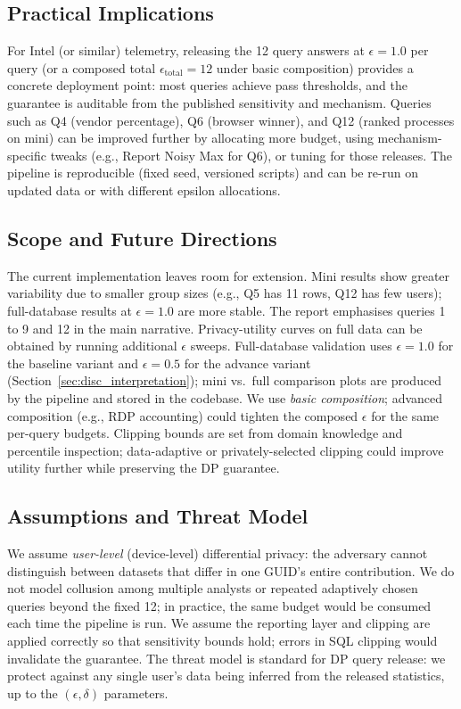 \documentclass[12pt,letterpaper]{article}
\begin{document}
\subsection{Practical Implications}
\label{sec:disc_practical}

For Intel (or similar) telemetry, releasing the 12 query answers at $\epsilon = 1.0$ per query (or a composed total $\epsilon_{\text{total}} = 12$ under basic composition) provides a concrete deployment point: most queries achieve pass thresholds, and the guarantee is auditable from the published sensitivity and mechanism. Queries such as Q4 (vendor percentage), Q6 (browser winner), and Q12 (ranked processes on mini) can be improved further by allocating more budget, using mechanism-specific tweaks (e.g., Report Noisy Max for Q6), or tuning for those releases. The pipeline is reproducible (fixed seed, versioned scripts) and can be re-run on updated data or with different epsilon allocations.

\subsection{Scope and Future Directions}
\label{sec:disc_limitations}

The current implementation leaves room for extension. Mini results show greater variability due to smaller group sizes (e.g., Q5 has 11 rows, Q12 has few users); full-database results at $\epsilon = 1.0$ are more stable. The report emphasises queries 1 to 9 and 12 in the main narrative. Privacy-utility curves on full data can be obtained by running additional $\epsilon$ sweeps. Full-database validation uses $\epsilon = 1.0$ for the baseline variant and $\epsilon = 0.5$ for the advance variant (Section~\ref{sec:disc_interpretation}); mini vs.\ full comparison plots are produced by the pipeline and stored in the codebase. We use \emph{basic composition}; advanced composition (e.g., RDP accounting) could tighten the composed $\epsilon$ for the same per-query budgets. Clipping bounds are set from domain knowledge and percentile inspection; data-adaptive or privately-selected clipping could improve utility further while preserving the DP guarantee.

\subsection{Assumptions and Threat Model}
\label{sec:disc_threat}

We assume \emph{user-level} (device-level) differential privacy: the adversary cannot distinguish between datasets that differ in one GUID's entire contribution. We do not model collusion among multiple analysts or repeated adaptively chosen queries beyond the fixed 12; in practice, the same budget would be consumed each time the pipeline is run. We assume the reporting layer and clipping are applied correctly so that sensitivity bounds hold; errors in SQL clipping would invalidate the guarantee. The threat model is standard for DP query release: we protect against any single user's data being inferred from the released statistics, up to the $(\epsilon,\delta)$ parameters.
\end{document}
